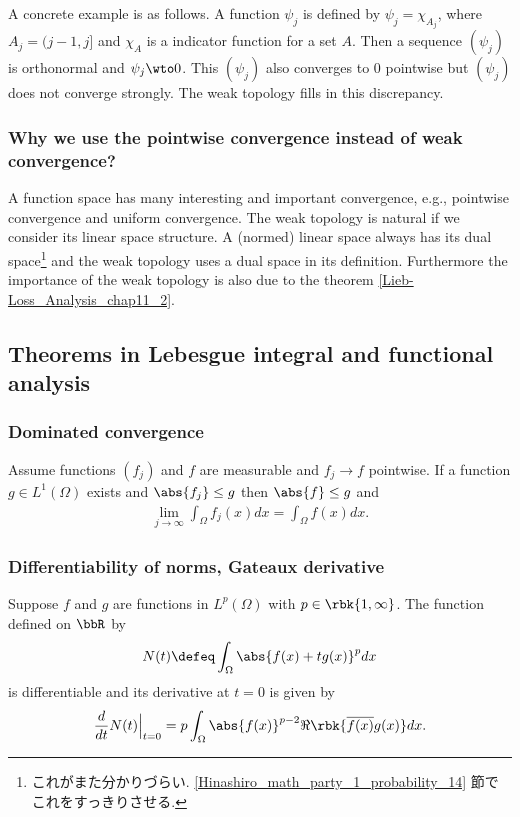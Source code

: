 \documentclass[openany, a4paper, oneside]{jsbook}
\begin{document}
A concrete example is as follows.
A function $\psi_j$ is defined by $\psi_j = \chi_{A_j}$, where $A_j = (j-1, j]$ and $\chi_A$ is a indicator function for a set $A$.
Then a sequence $(\psi_j)$ is orthonormal and $\psi_j \wto 0$.
This $(\psi_j)$ also converges to $0$ pointwise but $(\psi_j)$ does not converge strongly.
The weak topology fills in this discrepancy.
\subsubsection{Why we use the pointwise convergence instead of weak convergence?}

A function space has many interesting and important convergence, e.g., pointwise convergence and uniform convergence.
The weak topology is natural if we consider its linear space structure.
A (normed) linear space always has its dual space\footnote{これがまた分かりづらい. \ref{Hinashiro_math_party_1_probability_14} 節でこれをすっきりさせる.} and the weak topology uses a dual space in its definition.
Furthermore the importance of the weak topology is also due to the theorem \ref{Lieb-Loss_Analysis_chap11_2}.


\subsection{Theorems in Lebesgue integral and functional analysis}

\subsubsection{Dominated convergence}

\begin{thm}\label{Lieb-Loss_Analysis_chap11_6}
 Assume functions $(f_j)$ and $f$ are measurable and $f_j \to f$ pointwise.
 If a function $g \in L^1 (\Omega)$ exists and $\abs{f_j} \leq g$ then $\abs{f} \leq g$ and
\begin{align}
 \lim_{j \to \infty} \int_{\Omega} f_j (x) dx
 =
 \int_{\Omega} f (x) dx.
\end{align}
\end{thm}
\subsubsection{Differentiability of norms, Gateaux derivative}

\begin{thm}\label{Lieb-Loss_Analysis_chap11_26}
 Suppose $f$ and $g$ are functions in $L^p (\Omega)$ with $p \in \rbk{1, \infty}$.
 The function defined on $\bbR$ by
\begin{align}
 N (t)
 \defeq
 \int_{\Omega} \abs{f (x) + t g (x)}^{p} dx
\end{align}
is differentiable and its derivative at $t = 0$ is given by
\begin{align}
 \frac{d}{dt} N (t) \Big |_{t=0}
 =
 p \int_{\Omega} \abs{f (x)}^{p-2} \Re \rbk{\overline{f (x)} g (x)} dx.
\end{align}
\end{thm}
\end{document}
